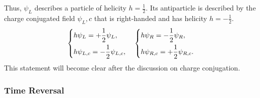 Thus, \(\psi_L\) describes a particle of helicity \(h=\tfrac12\). Its antiparticle is described by the charge conjugated field \(\psi_L,c\) that is right-handed and has helicity \(h=-\tfrac12\).
\[
    \begin{dcases}
        h \psi_L = +\frac{1}{2} \psi_L, \\
        h \psi_{L,c} = -\frac{1}{2} \psi_{L,c},
    \end{dcases} \quad \begin{dcases}
        h \psi_R = -\frac{1}{2} \psi_R, \\
        h \psi_{R,c} = +\frac{1}{2} \psi_{R,c}.
    \end{dcases}
\]
This statement will become clear after the discussion on charge conjugation.

\subsubsection{Time Reversal}

